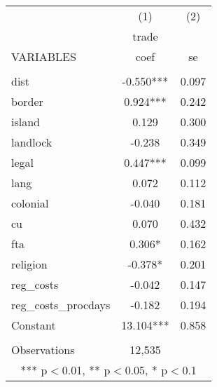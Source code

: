 \documentclass[]{article}
\begin{document}
\begin{tabular}{lcc} \hline
 & (1) & (2) \\
 & trade &  \\
VARIABLES & coef & se \\ \hline
 &  &  \\
dist & -0.550*** & 0.097 \\
border & 0.924*** & 0.242 \\
island & 0.129 & 0.300 \\
landlock & -0.238 & 0.349 \\
legal & 0.447*** & 0.099 \\
lang & 0.072 & 0.112 \\
colonial & -0.040 & 0.181 \\
cu & 0.070 & 0.432 \\
fta & 0.306* & 0.162 \\
religion & -0.378* & 0.201 \\
reg\_costs & -0.042 & 0.147 \\
reg\_costs\_procdays & -0.182 & 0.194 \\
Constant & 13.104*** & 0.858 \\
 &  &  \\
 Observations & 12,535 &  \\ \hline
\multicolumn{3}{c}{ *** p$<$0.01, ** p$<$0.05, * p$<$0.1} \\
\end{tabular}
\end{document}
